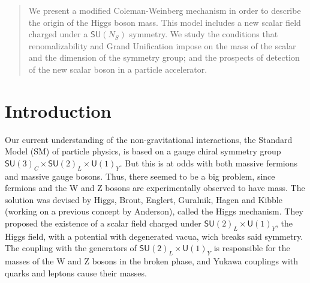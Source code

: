 \documentclass[aps,prd,preprintnumbers,nofootinbibn,twocolumn]{revtex4}
\begin{document}

\begin{abstract}
We present a modified Coleman-Weinberg mechanism in order to describe the origin of the Higgs boson mass. This model includes a new scalar field charged under a $\mathsf{SU}(N_S)$ symmetry. We study the conditions that renomalizability and Grand Unification impose on the mass of the scalar and the dimension of the symmetry group; and the prospects of detection of the new scalar boson in a particle accelerator.
\end{abstract}
\maketitle
\section{Introduction}
Our current understanding of the non-gravitational interactions, the Standard Model (SM) of particle physics, is based on a gauge chiral symmetry group $\mathsf{SU}(3)_C \times \mathsf{SU}(2)_L \times \mathsf{U}(1)_Y $. But this is at odds with both massive fermions and massive gauge bosons. Thus, there seemed to be a big problem, since fermions and the W and Z bosons are experimentally observed to have mass. The solution was devised by Higgs, Brout, Englert, Guralnik, Hagen and Kibble (working on a previous concept by Anderson), called the Higgs mechanism. They proposed the existence of a scalar field charged under $\mathsf{SU}(2)_L \times \mathsf{U}(1)_Y$, the Higgs field, with a potential with degenerated vacua, wich breaks said symmetry. The coupling with the generators of $\mathsf{SU}(2)_L \times \mathsf{U}(1)_Y$ is responsible for the masses of the W and Z bosons in the broken phase, and Yukawa couplings with quarks and leptons cause their masses. 
\end{document}
